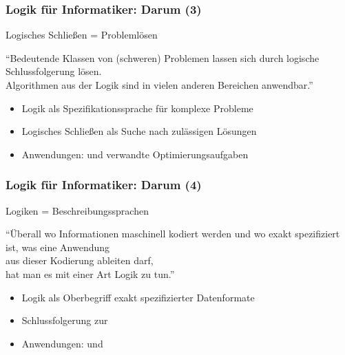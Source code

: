 \documentclass[aspectratio=1610,onlymath]{beamer}
\begin{document}
\begin{frame}\frametitle{Logik für Informatiker: Darum (3)}

\begin{center}
\LARGE 
Logisches Schließen = Problemlösen

\bigskip
\large
"`Bedeutende Klassen von (schweren) Problemen lassen sich durch logische Schlussfolgerung lösen.\\
Algorithmen aus der Logik sind in vielen anderen Bereichen anwendbar."'
\end{center}


\begin{itemize}
\item Logik als Spezifikationssprache für komplexe Probleme
\item Logisches Schließen als Suche nach zulässigen Lösungen
\item Anwendungen:  und verwandte Optimierungsaufgaben
\end{itemize}

\end{frame}

\begin{frame}\frametitle{Logik für Informatiker: Darum (4)}

\begin{center}
\LARGE 
Logiken = Beschreibungssprachen

\bigskip
\large
"`Überall wo Informationen maschinell kodiert werden und wo exakt spezifiziert ist, was eine Anwendung\\ aus dieser Kodierung ableiten darf,\\hat man es mit einer Art Logik zu tun."'
\end{center}


\begin{itemize}
\item Logik als Oberbegriff exakt spezifizierter Datenformate
\item Schlussfolgerung zur 
\item Anwendungen:  und 
\end{itemize}
\end{frame}
\end{document}
